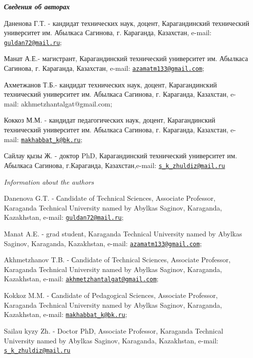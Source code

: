 \begin{authorinfo}
\emph{{\bfseries Сведения об авторах}}

Даненова Г.Т. - кандидат технических наук, доцент, Карагандинский
технический университет им. Абылкаса Сагинова, г. Караганда, Казахстан,
e-mail: \href{mailto:guldan72@mail.ru}{\nolinkurl{guldan72@mail.ru}};

Манат А.Е.- магистрант, Карагандинский технический университет им.
Абылкаса Сагинова, г. Караганда, Казахстан, e-mail:
\href{mailto:azamatm133@gmail.com}{\nolinkurl{azamatm133@gmail.com}};

Ахметжанов Т.Б.- кандидат технических наук, доцент, Карагандинский
технический университет им. Абылкаса Сагинова, г. Караганда, Казахстан,
e-mail: akhmetzhantalgat@gmail.com;

Коккоз М.М. - кандидат педагогических наук, доцент, Карагандинский
технический университет им. Абылкаса Сагинова, г. Караганда, Казахстан,
e-mail: \href{mailto:makhabbat_k@bk.ru}{\nolinkurl{makhabbat\_k@bk.ru}};

Сайлау қызы Ж. - доктор PhD, Карагандинский технический университет им.
Абылкаса Сагинова, г.Караганда, Казахстан,e-mail:
\href{mailto:s_k_zhuldiz@mail.ru}{\nolinkurl{s\_k\_zhuldiz@mail.ru}}

\emph{Information about the authors}

Danenova G.T. - Сandidate of Technical Sciences, Associate Professor,
Karaganda Technical University named by Abylkas Saginov, Karaganda,
Kazakhstan, e-mail:
\href{mailto:guldan72@mail.ru}{\nolinkurl{guldan72@mail.ru}};

Manat A.E. - grad student, Karaganda Technical University named by
Abylkas Saginov, Karaganda, Kazakhstan, e-mail:
\href{mailto:azamatm133@gmail.com}{\nolinkurl{azamatm133@gmail.com}};

Akhmetzhanov T.B. - Сandidate of Technical Sciences, Associate
Professor, Karaganda Technical University named by Abylkas Saginov,
Karaganda, Kazakhstan, e-mail:
\href{mailto:akhmetzhantalgat@gmail.com}{\nolinkurl{akhmetzhantalgat@gmail.com}};

Kokkoz M.M. - Сandidate of Pedagogical Sciences, Associate Professor,
Karaganda Technical University named by Abylkas Saginov, Karaganda,
Kazakhstan, e-mail:
\href{mailto:makhabbat_k@bk.ru}{\nolinkurl{makhabbat\_k@bk.ru}};

Sailau kyzy Zh. - Doctor PhD, Associate Professor, Karaganda Technical
University named by Abylkas Saginov, Karaganda, Kazakhstan, e-mail:
\href{mailto:s_k_zhuldiz@mail.ru}{\nolinkurl{s\_k\_zhuldiz@mail.ru}}
\end{authorinfo}
